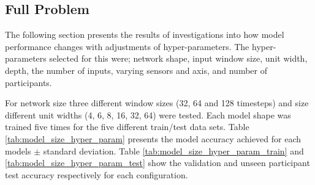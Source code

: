 \documentclass[sensors,article,submit,moreauthors,pdftex]{Definitions/mdpi}
\begin{document}
 \subsection{Full Problem}%
The following section presents the results of investigations into how model performance changes with adjustments of hyper-parameters. The hyper-parameters selected for this were; network shape, input window size, unit width, depth, the number of inputs, varying sensors and axis, and number of participants.

For network size three different window sizes (32, 64 and 128 timesteps) and size different unit widths (4, 6, 8, 16, 32, 64) were tested. Each model shape was trained five times for the five different train/test data sets. Table \ref{tab:model_size_hyper_param} presents the model accuracy achieved for each models $\pm$ standard deviation. Table \ref{tab:model_size_hyper_param_train} and \ref{tab:model_size_hyper_param_test} show the validation and unseen participant test accuracy respectively for each configuration.
\end{document}
